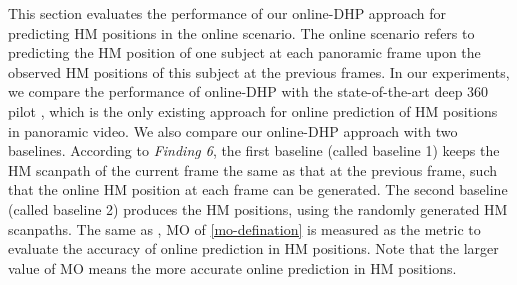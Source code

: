 \documentclass[10pt,journal,compsoc]{IEEEtran}
\begin{document}


This section evaluates the performance of our online-DHP approach for predicting HM positions in the online scenario.
The online scenario refers to predicting the HM position of one subject at each panoramic frame upon the observed HM positions of this subject at the previous frames.
In our experiments, we compare the performance of online-DHP with the state-of-the-art deep 360 pilot \cite{hu2017deep}, which is the only existing approach for online prediction of HM positions in panoramic video.
We also compare our online-DHP approach with two baselines. According to \textit{Finding 6}, the first baseline (called baseline 1) keeps the HM scanpath of the current frame the same as that at the previous frame, such that the online HM position at each frame can be generated.
The second baseline (called baseline 2) produces the HM positions, using the randomly generated HM scanpaths. The same as \cite{hu2017deep}, MO of \eqref{mo-defination} is measured as the metric to evaluate the accuracy of online prediction in HM positions. Note that the larger value of MO means the more accurate online prediction in HM positions.
\end{document}
